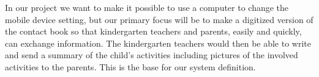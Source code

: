 In our project we want to make it possible to use a computer to change the mobile device setting, but our primary focus will be to make a digitized version of the contact book so that kindergarten teachers and parents, easily and quickly, can exchange information. The kindergarten teachers would then be able to write and send a summary of the child's activities including pictures of the involved activities to the parents. This is the base for our system definition.    